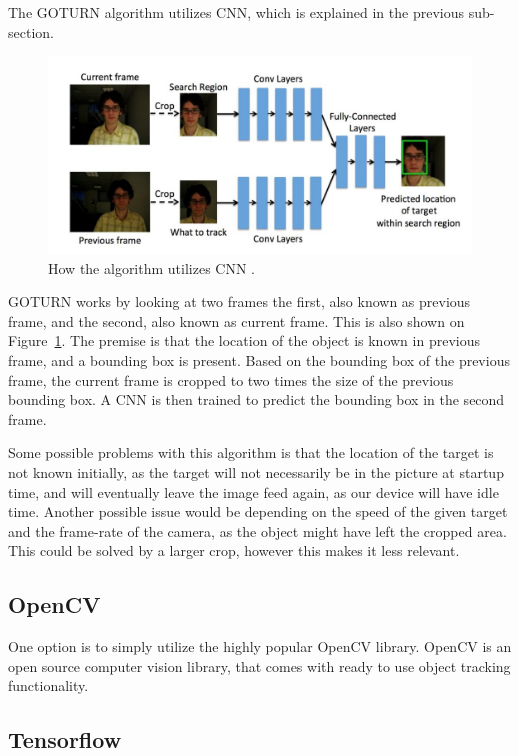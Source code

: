 The GOTURN algorithm utilizes CNN, which is explained in the previous sub-section.
\begin{figure}[H]
	\centering
	\includegraphics[scale=0.80]{images/GOTURN-architecture.jpg}
	\caption{How the algorithm utilizes CNN \cite{goturn}.}
	\label{fig:goturn-arch}
\end{figure}
GOTURN works by looking at two frames the first, also known as previous frame, and the second, also known as current frame.
This is also shown on Figure~\ref{fig:goturn-arch}.
The premise is that the location of the object is known in previous frame, and a bounding box is present.
Based on the bounding box of the previous frame, the current frame is cropped to two times the size of the previous bounding box.
A CNN is then trained to predict the bounding box in the second frame.


Some possible problems with this algorithm is that the location of the target is not known initially, as the target will not necessarily be in the picture at startup time, and will eventually leave the image feed again, as our device will have idle time.
Another possible issue would be depending on the speed of the given target and the frame-rate of the camera, as the object might have left the cropped area. 
This could be solved by a larger crop, however this makes it less relevant.

\subsection{OpenCV}
One option is to simply utilize the highly popular OpenCV library.
OpenCV is an open source computer vision library, that comes with ready to use object tracking functionality.



\subsection{Tensorflow}



